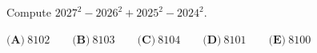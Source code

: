 Compute $2027^2-2026^2+2025^2-2024^2$.

$\textbf{(A)}~8102\qquad\textbf{(B)}~8103\qquad\textbf{(C)}~8104\qquad\textbf{(D)}~8101\qquad\textbf{(E)}~8100\qquad$
